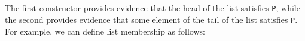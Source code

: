 \begin{fence}
\begin{code}%
\>[0]\AgdaSpace{}%
\AgdaSpace{}%
\AgdaSymbol{\{}\AgdaSpace{}%
\AgdaSymbol{:}\AgdaSpace{}%
\AgdaSymbol{\}}\AgdaSpace{}%
\AgdaSymbol{(}\AgdaSpace{}%
\AgdaSymbol{:}\AgdaSpace{}%
\AgdaSpace{}%
\AgdaSpace{}%
\AgdaSymbol{)}\AgdaSpace{}%
\AgdaSymbol{:}\AgdaSpace{}%
\AgdaSpace{}%
\AgdaSpace{}%
\AgdaSpace{}%
\AgdaSpace{}%
\<%
\\
\>[0][@{}l@{\AgdaIndent{0}}]%
\>[2]%
\>[8]\AgdaSymbol{:}\AgdaSpace{}%
\AgdaSpace{}%
\AgdaSymbol{\{}\AgdaSpace{}%
\AgdaSymbol{:}\AgdaSpace{}%
\AgdaSymbol{\}}\AgdaSpace{}%
\AgdaSymbol{\{}\AgdaSpace{}%
\AgdaSymbol{:}\AgdaSpace{}%
\AgdaSpace{}%
\AgdaSymbol{\}}\AgdaSpace{}%
\AgdaSpace{}%
\AgdaSpace{}%
\AgdaSpace{}%
\AgdaSpace{}%
\AgdaSpace{}%
\AgdaSpace{}%
\AgdaSymbol{(}\AgdaSpace{}%
\AgdaSpace{}%
\AgdaSymbol{)}\<%
\\
%
\>[2]\AgdaSpace{}%
\AgdaSymbol{:}\AgdaSpace{}%
\AgdaSpace{}%
\AgdaSymbol{\{}\AgdaSpace{}%
\AgdaSymbol{:}\AgdaSpace{}%
\AgdaSymbol{\}}\AgdaSpace{}%
\AgdaSymbol{\{}\AgdaSpace{}%
\AgdaSymbol{:}\AgdaSpace{}%
\AgdaSpace{}%
\AgdaSymbol{\}}\AgdaSpace{}%
\AgdaSpace{}%
\AgdaSpace{}%
\AgdaSpace{}%
\AgdaSpace{}%
\AgdaSpace{}%
\AgdaSpace{}%
\AgdaSpace{}%
\AgdaSymbol{(}\AgdaSpace{}%
\AgdaSpace{}%
\AgdaSymbol{)}\<%
\end{code}
\end{fence}

The first constructor provides evidence that the head of the list
satisfies \texttt{P}, while the second provides evidence that some
element of the tail of the list satisfies \texttt{P}. For example, we
can define list membership as follows:


